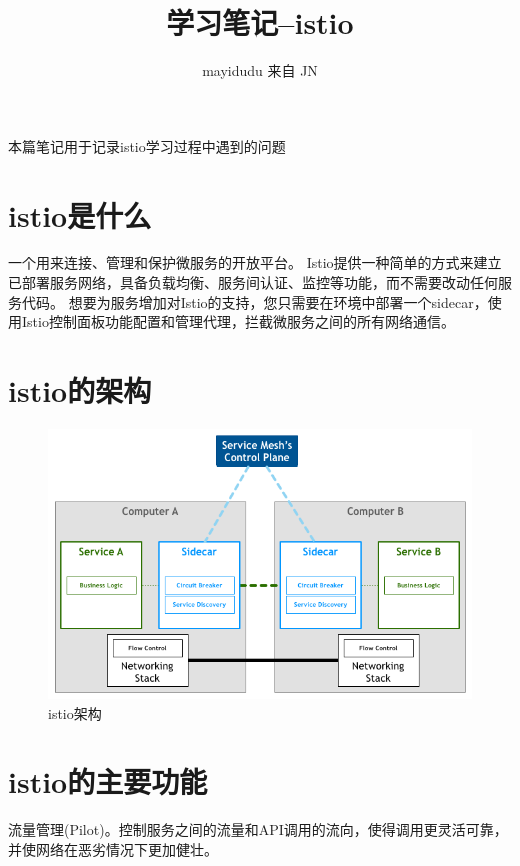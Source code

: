 \documentclass{ctexart}
\newcommand{\jn}{JN}
\begin{document}
\title{学习笔记--istio}
\author{mayidudu 来自 \jn}
\maketitle
\tableofcontents


\begin{center}
	本篇笔记用于记录istio学习过程中遇到的问题
\end{center}



\section{istio是什么}
一个用来连接、管理和保护微服务的开放平台。 
Istio提供一种简单的方式来建立已部署服务网络，具备负载均衡、服务间认证、监控等功能，而不需要改动任何服务代码。
想要为服务增加对Istio的支持，您只需要在环境中部署一个sidecar，使用Istio控制面板功能配置和管理代理，拦截微服务之间的所有网络通信。


\section{istio的架构}
\begin{figure}[H]
\includegraphics[scale=0.6]{istio/framework.png}
\caption{istio架构}
\end{figure}

\section{istio的主要功能}
流量管理(Pilot)。控制服务之间的流量和API调用的流向，使得调用更灵活可靠，并使网络在恶劣情况下更加健壮。
\end{document}
